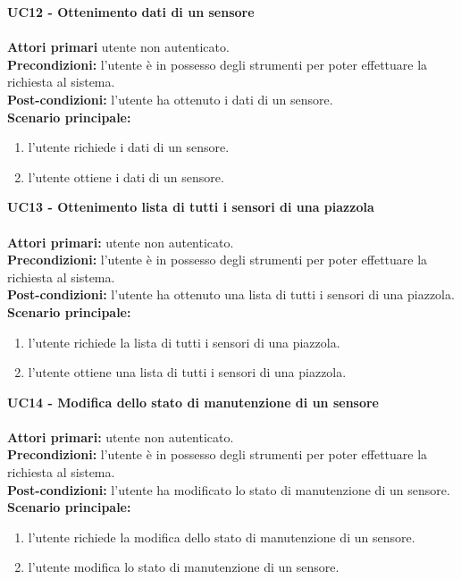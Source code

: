 \leavevmode\newline
\textbf{UC12 - Ottenimento dati di un sensore}
\\\\
\textbf{Attori primari} utente non autenticato.
\\
\textbf{Precondizioni:} l'utente è in possesso degli strumenti per poter effettuare la richiesta al sistema.
\\
\textbf{Post-condizioni:} l'utente ha ottenuto i dati di un sensore.
\\
\textbf{Scenario principale:}
\begin{enumerate}
    \item l'utente richiede i dati di un sensore.
    \item l'utente ottiene i dati di un sensore.
\end{enumerate}
\leavevmode\newline
\textbf{UC13 - Ottenimento lista di tutti i sensori di una piazzola}
\\\\
\textbf{Attori primari:} utente non autenticato.
\\
\textbf{Precondizioni:} l'utente è in possesso degli strumenti per poter effettuare la richiesta al sistema.
\\
\textbf{Post-condizioni:} l'utente ha ottenuto una lista di tutti i sensori di una piazzola.
\\
\textbf{Scenario principale:}
\begin{enumerate}
    \item l'utente richiede la lista di tutti i sensori di una piazzola.
    \item l'utente ottiene una lista di tutti i sensori di una piazzola.
\end{enumerate}
\leavevmode\newline
\textbf{UC14 - Modifica dello stato di manutenzione di un sensore}
\\\\
\textbf{Attori primari:} utente non autenticato.
\\
\textbf{Precondizioni:} l'utente è in possesso degli strumenti per poter effettuare la richiesta al sistema.
\\
\textbf{Post-condizioni:} l'utente ha modificato lo stato di manutenzione di un sensore.
\\
\textbf{Scenario principale:}
\begin{enumerate}
    \item l'utente richiede la modifica dello stato di manutenzione di un sensore.
    \item l'utente modifica lo stato di manutenzione di un sensore.
\end{enumerate}

